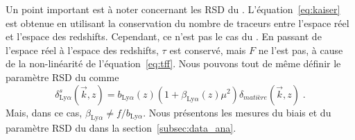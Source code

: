 Un point important est à noter concernant les RSD du \lya{}.
L'équation~\ref{eq:kaiser} est obtenue en utilisant la conservation du nombre de traceurs entre l'espace réel et l'espace des redshifts. Cependant, ce n'est pas le cas du \lya{}.
En passant de l'espace réel à l'espace des redshifts, $\tau$ est conservé, mais $F$ ne l'est pas, à cause de la non-linéarité de l'équation~\ref{eq:tff}.
Nous pouvons tout de même définir le paramètre RSD du \lya{} comme
\begin{equation}
  \label{eq:kaiser4}
  \delta_{\mathrm{Ly}\alpha}^{s}(\vec k, z) = b_{\mathrm{Ly}\alpha}(z) (1+ \beta_{\mathrm{Ly}\alpha}(z) \mu^2) \delta_{matière}(\vec k, z)   \; .
\end{equation}
Mais, dans ce cas, $ \beta_{\mathrm{Ly}\alpha} \neq f / b_{\mathrm{Ly}\alpha}$.
Nous présentons les mesures du biais et du paramètre RSD du \lya{} dans la section~\ref{subsec:data_ana}.

